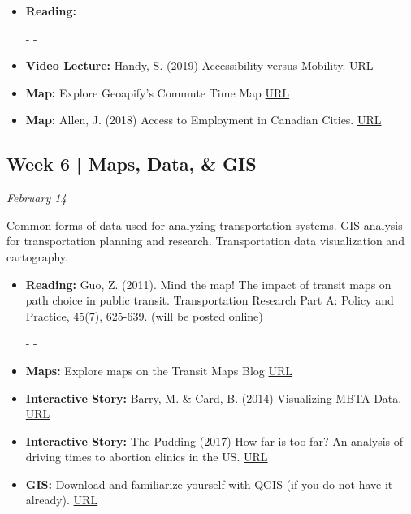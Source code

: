 \documentclass[11pt]{article}
\begin{document}
	\begin{itemize}
		
		\item \textbf{Reading:} 
		
		- - 
		
		\item \textbf{Video Lecture:} Handy, S. (2019) Accessibility versus Mobility.  \href{https://www.youtube.com/watch?v=4OMv6CqrzvE}{URL}	
		
		\item \textbf{Map:} Explore Geoapify's Commute Time Map \href{https://commutetimemap.com/}{URL}
		
		\item \textbf{Map:} Allen, J. (2018) Access to Employment in
		Canadian Cities. \href{https://sausy-lab.github.io/canada-transit-access/map.html}{URL}
		
		
		
	\end{itemize}
	
	
	
	
	
	
	\subsection*{Week 6 | Maps, Data, \& GIS}
	
	\textit{February 14}
		
	Common forms of data used for analyzing transportation systems. GIS analysis for transportation planning and research. Transportation data visualization and cartography.
	
	
	\begin{itemize}
		
		\item \textbf{Reading:} Guo, Z. (2011). Mind the map! The impact of transit maps on path choice in public transit. Transportation Research Part A: Policy and Practice, 45(7), 625-639. (will be posted online)
		
		- -
		
		\item \textbf{Maps:} Explore maps on the Transit Maps Blog \href{http://transitmap.net/}{URL}
		
		\item \textbf{Interactive Story:} Barry, M. \& Card, B. (2014) Visualizing MBTA Data. \href{http://mbtaviz.github.io/}{URL}
		
		\item \textbf{Interactive Story:} The Pudding (2017) How far is too far? An analysis of driving times to abortion clinics in the US. \href{https://pudding.cool/2017/09/clinics/}{URL}
		
		\item \textbf{GIS:} Download and familiarize yourself with QGIS (if you do not have it already). \href{https://www.qgis.org/en/site/index.html}{URL} 
		
		
	\end{itemize}
	
\end{document}
